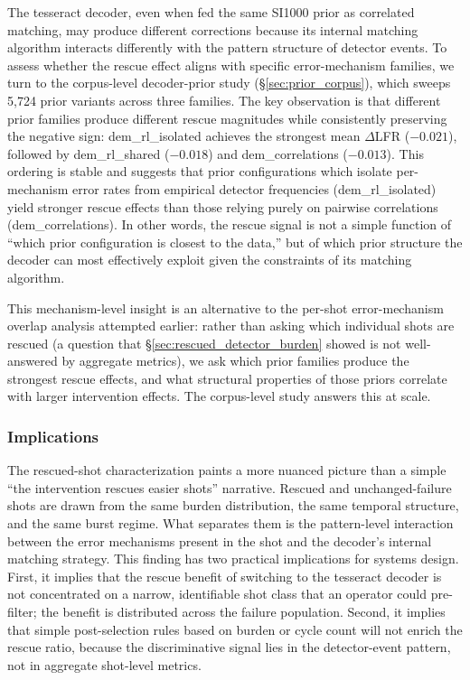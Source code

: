 The tesseract decoder, even when fed the same SI1000 prior as correlated matching, may produce different corrections because its internal matching algorithm interacts differently with the pattern structure of detector events. To assess whether the rescue effect aligns with specific error-mechanism families, we turn to the corpus-level decoder-prior study (\S\ref{sec:prior_corpus}), which sweeps 5,724 prior variants across three families. The key observation is that different prior families produce different rescue magnitudes while consistently preserving the negative sign: dem\_rl\_isolated achieves the strongest mean $\Delta$LFR ($-0.021$), followed by dem\_rl\_shared ($-0.018$) and dem\_correlations ($-0.013$). This ordering is stable and suggests that prior configurations which isolate per-mechanism error rates from empirical detector frequencies (dem\_rl\_isolated) yield stronger rescue effects than those relying purely on pairwise correlations (dem\_correlations). In other words, the rescue signal is not a simple function of ``which prior configuration is closest to the data,'' but of which prior structure the decoder can most effectively exploit given the constraints of its matching algorithm.

This mechanism-level insight is an alternative to the per-shot error-mechanism overlap analysis attempted earlier: rather than asking which individual shots are rescued (a question that \S\ref{sec:rescued_detector_burden} showed is not well-answered by aggregate metrics), we ask which prior families produce the strongest rescue effects, and what structural properties of those priors correlate with larger intervention effects. The corpus-level study answers this at scale.

\subsubsection{Implications}

The rescued-shot characterization paints a more nuanced picture than a simple ``the intervention rescues easier shots'' narrative. Rescued and unchanged-failure shots are drawn from the same burden distribution, the same temporal structure, and the same burst regime. What separates them is the pattern-level interaction between the error mechanisms present in the shot and the decoder's internal matching strategy. This finding has two practical implications for systems design. First, it implies that the rescue benefit of switching to the tesseract decoder is not concentrated on a narrow, identifiable shot class that an operator could pre-filter; the benefit is distributed across the failure population. Second, it implies that simple post-selection rules based on burden or cycle count will not enrich the rescue ratio, because the discriminative signal lies in the detector-event pattern, not in aggregate shot-level metrics.

